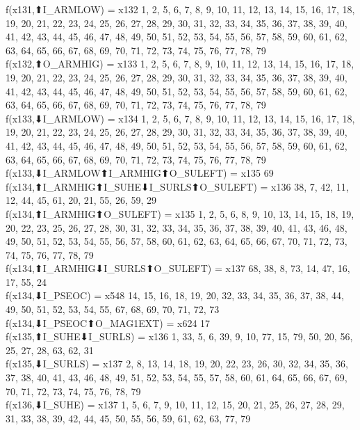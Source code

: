 f(x131,⬆I_ARMLOW) = x132 {1, 2, 5, 6, 7, 8, 9, 10, 11, 12, 13, 14, 15, 16, 17, 18, 19, 20, 21, 22, 23, 24, 25, 26, 27, 28, 29, 30, 31, 32, 33, 34, 35, 36, 37, 38, 39, 40, 41, 42, 43, 44, 45, 46, 47, 48, 49, 50, 51, 52, 53, 54, 55, 56, 57, 58, 59, 60, 61, 62, 63, 64, 65, 66, 67, 68, 69, 70, 71, 72, 73, 74, 75, 76, 77, 78, 79} \\
f(x132,⬆O_ARMHIG) = x133 {1, 2, 5, 6, 7, 8, 9, 10, 11, 12, 13, 14, 15, 16, 17, 18, 19, 20, 21, 22, 23, 24, 25, 26, 27, 28, 29, 30, 31, 32, 33, 34, 35, 36, 37, 38, 39, 40, 41, 42, 43, 44, 45, 46, 47, 48, 49, 50, 51, 52, 53, 54, 55, 56, 57, 58, 59, 60, 61, 62, 63, 64, 65, 66, 67, 68, 69, 70, 71, 72, 73, 74, 75, 76, 77, 78, 79} \\
f(x133,⬇I_ARMLOW) = x134 {1, 2, 5, 6, 7, 8, 9, 10, 11, 12, 13, 14, 15, 16, 17, 18, 19, 20, 21, 22, 23, 24, 25, 26, 27, 28, 29, 30, 31, 32, 33, 34, 35, 36, 37, 38, 39, 40, 41, 42, 43, 44, 45, 46, 47, 48, 49, 50, 51, 52, 53, 54, 55, 56, 57, 58, 59, 60, 61, 62, 63, 64, 65, 66, 67, 68, 69, 70, 71, 72, 73, 74, 75, 76, 77, 78, 79} \\
f(x133,⬇I_ARMLOW⬆I_ARMHIG⬆O_SULEFT) = x135 {69} \\
f(x134,⬆I_ARMHIG⬆I_SUHE⬇I_SURLS⬆O_SULEFT) = x136 {38, 7, 42, 11, 12, 44, 45, 61, 20, 21, 55, 26, 59, 29} \\
f(x134,⬆I_ARMHIG⬆O_SULEFT) = x135 {1, 2, 5, 6, 8, 9, 10, 13, 14, 15, 18, 19, 20, 22, 23, 25, 26, 27, 28, 30, 31, 32, 33, 34, 35, 36, 37, 38, 39, 40, 41, 43, 46, 48, 49, 50, 51, 52, 53, 54, 55, 56, 57, 58, 60, 61, 62, 63, 64, 65, 66, 67, 70, 71, 72, 73, 74, 75, 76, 77, 78, 79} \\
f(x134,⬆I_ARMHIG⬇I_SURLS⬆O_SULEFT) = x137 {68, 38, 8, 73, 14, 47, 16, 17, 55, 24} \\
f(x134,⬇I_PSEOC) = x548 {14, 15, 16, 18, 19, 20, 32, 33, 34, 35, 36, 37, 38, 44, 49, 50, 51, 52, 53, 54, 55, 67, 68, 69, 70, 71, 72, 73} \\
f(x134,⬇I_PSEOC⬆O_MAG1EXT) = x624 {17} \\
f(x135,⬆I_SUHE⬇I_SURLS) = x136 {1, 33, 5, 6, 39, 9, 10, 77, 15, 79, 50, 20, 56, 25, 27, 28, 63, 62, 31} \\
f(x135,⬇I_SURLS) = x137 {2, 8, 13, 14, 18, 19, 20, 22, 23, 26, 30, 32, 34, 35, 36, 37, 38, 40, 41, 43, 46, 48, 49, 51, 52, 53, 54, 55, 57, 58, 60, 61, 64, 65, 66, 67, 69, 70, 71, 72, 73, 74, 75, 76, 78, 79} \\
f(x136,⬇I_SUHE) = x137 {1, 5, 6, 7, 9, 10, 11, 12, 15, 20, 21, 25, 26, 27, 28, 29, 31, 33, 38, 39, 42, 44, 45, 50, 55, 56, 59, 61, 62, 63, 77, 79} \\
